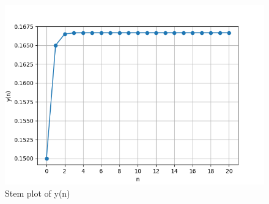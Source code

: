 \documentclass[journal,12pt,twocolumn]{IEEEtran}
\theoremstyle{remark}
\begin{document}
\begin{figure}[h]
  
  \includegraphics[width=1.0\columnwidth]{figs/graph.png}
  \caption{Stem plot of y(n)}
  \label{fig:your_label}
\end{figure}
\end{document}
